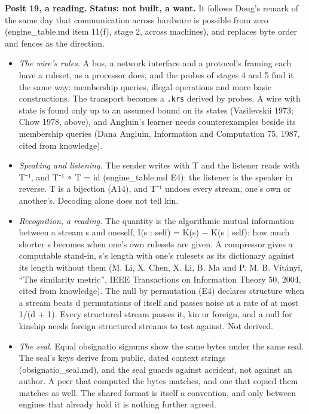 \textbf{Posit 19, a reading. Status: not built, a want.} It follows Doug's remark of the same day that communication across hardware is possible from zero (engine\_\allowbreak{}table.md item 11(f), stage 2, across machines), and replaces byte order and fences as the direction.

\begin{itemize}
\item \emph{The wire's rules.} A bus, a network interface and a protocol's framing each have a ruleset, as a processor does, and the probes of stages 4 and 5 find it the same way: membership queries, illegal operations and more basic constructions. The transport becomes a \texttt{.\allowbreak{}krs} derived by probes. A wire with state is found only up to an assumed bound on its states (Vasilevskii 1973; Chow 1978, above), and Angluin's learner needs counterexamples beside its membership queries (Dana Angluin, Information and Computation 75, 1987, cited from knowledge).
\item \emph{Speaking and listening.} The sender writes with T and the listener reads with T⁻¹, and T⁻¹ ∘ T = id (engine\_\allowbreak{}table.md E4): the listener is the speaker in reverse. T is a bijection (A14), and T⁻¹ undoes every stream, one's own or another's. Decoding alone does not tell kin.
\item \emph{Recognition, a reading.} The quantity is the algorithmic mutual information between a stream s and oneself, I(s : self) = K(s) − K(s | self): how much shorter s becomes when one's own rulesets are given. A compressor gives a computable stand-in, s's length with one's rulesets as its dictionary against its length without them (M. Li, X. Chen, X. Li, B. Ma and P. M. B. Vitányi, “The similarity metric”, IEEE Transactions on Information Theory 50, 2004, cited from knowledge). The null by permutation (E4) declares structure when a stream beats d permutations of itself and passes noise at a rate of at most 1/(d + 1). Every structured stream passes it, kin or foreign, and a null for kinship needs foreign structured streams to test against. Not derived.
\item \emph{The seal.} Equal obsignatio signums show the same bytes under the same seal. The seal's keys derive from public, dated context strings (obsignatio\_\allowbreak{}seal.md), and the seal guards against accident, not against an author. A peer that computed the bytes matches, and one that copied them matches as well. The shared format is itself a convention, and only between engines that already hold it is nothing further agreed.

\end{itemize}
